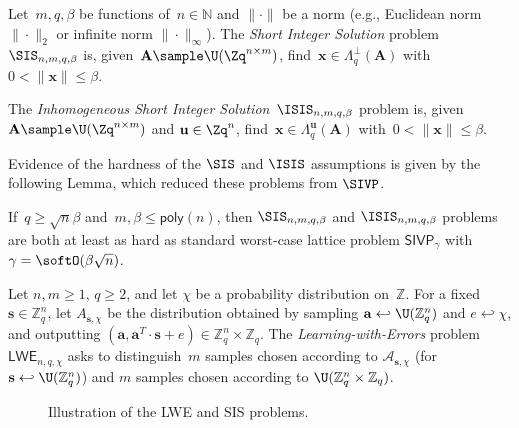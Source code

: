 \begin{definition} \label{de:sis}  
  Let~$m,q,\beta$ be functions of~$n \in \mathbb{N}$ and $\|\cdot\|$ be a norm (e.g., Euclidean norm $\|\cdot\|_2$ or infinite norm $\|\cdot\|_\infty$).
  The \textit{Short Integer Solution} problem $\SIS_{n,m,q,\beta}$ is, given~$\mathbf{A} \sample \U(\Zq^{n \times m})$, find~$\mathbf{x} \in \Lambda_q^{\perp}(\mathbf{A})$ with~$0 < \|\mathbf{x}\| \leq \beta$.

  The \textit{Inhomogeneous Short Integer Solution}~$\ISIS_{n,m,q,\beta}$ problem is, given~$\mathbf{A} \sample \U(\Zq^{n \times m})$ and $\mathbf{u} \in \Zq^n$, find~$\mathbf{x} \in \Lambda_q^{\mathbf{u}}(\mathbf{A})$ with~$0 < \| \mathbf{x} \| \leq \beta$.
\end{definition}

Evidence of the hardness of the $\SIS$ and $\ISIS$ assumptions is given by the following Lemma, which reduced these problems from $\SIVP$.

\begin{lemma} \label{le:sis-hard}
  If~$q \geq \sqrt{n} \beta$ and~$m,\beta \leq \mathsf{poly}(n)$, then $\SIS_{n,m,q,\beta}$ and $\ISIS_{n,m,q,\beta}$ problems are both at least as hard as
  standard worst-case lattice problem $\mathsf{SIVP}_\gamma$ with~$\gamma = \softO(\beta\sqrt{n})$.
\end{lemma}

\begin{definition} \label{de:lwe} 
  Let $n,m \geq 1$, $q \geq 2$, and let $\chi$ be a probability distribution on~$\mathbb{Z}$.
  For a fixed $\mathbf{s} \in \mathbb{Z}_q^n$, let $A_{\mathbf{s}, \chi}$ be the distribution obtained by sampling $\mathbf{a} \hookleftarrow  \U(\mathbb{Z}_q^n)$ and $e \hookleftarrow \chi$, and outputting $(\mathbf{a}, \mathbf{a}^T\cdot\mathbf{s} + e) \in \mathbb{Z}_q^n \times \mathbb{Z}_q$.
  The \emph{Learning-with-Errors} problem $\mathsf{LWE}_{n,q,\chi}$ asks to distinguish~$m$ samples chosen according to $\mathcal{A}_{\mathbf{s},\chi}$ (for $\mathbf{s} \hookleftarrow \U(\mathbb{Z}_q^n)$) and $m$ samples chosen according to $\U(\mathbb{Z}_q^n \times \mathbb{Z}_q)$.
\end{definition}

\begin{figure}
  \centering
  
  \caption{Illustration of the LWE and SIS problems.}
  \label{fig:lwe-sis}
\end{figure}

